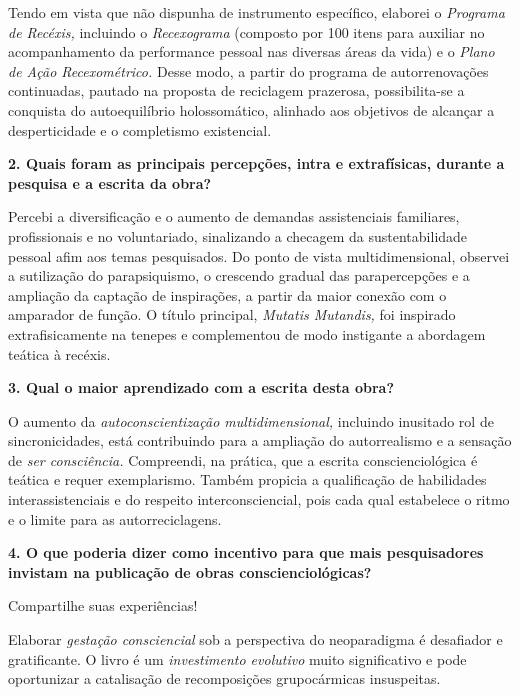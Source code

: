 \documentclass{gescons}
\begin{document}
\begin{multicols}{2}
Tendo em vista que não dispunha de instrumento específico, elaborei o \emph{Programa de Recéxis,} incluindo o \emph{Recexograma} (composto por 100 itens para auxiliar no acompanhamento da performance pessoal nas diversas áreas da vida) e o \emph{Plano de Ação Recexométrico.} Desse modo, a partir do programa de autorrenovações continuadas, pautado na proposta de reciclagem prazerosa, possibilita-se a conquista do autoequilíbrio holossomático, alinhado aos objetivos de alcançar a desperticidade e o completismo existencial.

\textbf{2. Quais foram as principais percepções, intra e extrafísicas, durante a pesquisa e a escrita da obra?}

Percebi a diversificação e o aumento de demandas assistenciais familiares, profissionais e no voluntariado, sinalizando a checagem da sustentabilidade pessoal afim aos temas pesquisados. Do ponto de vista multidimensional, observei a sutilização do parapsiquismo, o crescendo gradual das parapercepções e a ampliação da captação de inspirações, a partir da maior conexão com o amparador de função. O título principal, \emph{Mutatis Mutandis,} foi inspirado extrafisicamente na tenepes e complementou de modo instigante a abordagem teática à recéxis.

\textbf{3. Qual o maior aprendizado com a escrita desta obra?}

O aumento da \emph{autoconscientização multidimensional,} incluindo inusitado rol de sincronicidades, está contribuindo para a ampliação do autorrealismo e a sensação de \emph{ser consciência.} Compreendi, na prática, que a escrita conscienciológica é teática e requer exemplarismo. Também propicia a qualificação de habilidades interassistenciais e do respeito interconsciencial, pois cada qual estabelece o ritmo e o limite para as autorreciclagens.

\textbf{4. O que poderia dizer como incentivo para que mais pesquisadores invistam na publicação de obras conscienciológicas?}

Compartilhe suas experiências!

Elaborar \emph{gestação consciencial} sob a perspectiva do neoparadigma é desafiador e gratificante. O livro é um \emph{investimento evolutivo} muito significativo e pode oportunizar a catalisação de recomposições grupocármicas insuspeitas.

% 
    
    \end{multicols}
\end{document}
